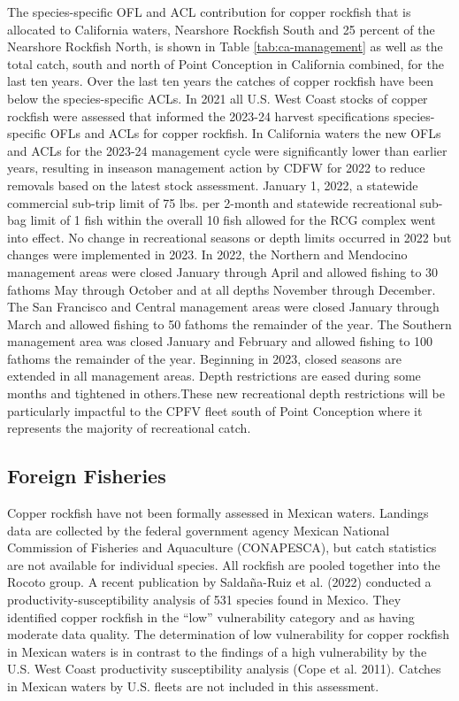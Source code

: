 \documentclass[11pt,
  english,
  letterpaper,
]{article}
\begin{document}
The species-specific OFL and ACL contribution for copper rockfish that is allocated to California waters, Nearshore Rockfish South and 25 percent of the Nearshore Rockfish North, is shown in Table \ref{tab:ca-management} as well as the total catch, south and north of Point Conception in California combined, for the last ten years. Over the last ten years the catches of copper rockfish have been below the species-specific ACLs. In 2021 all U.S. West Coast stocks of copper rockfish were assessed that informed the 2023-24 harvest specifications species-specific OFLs and ACLs for copper rockfish. In California waters the new OFLs and ACLs for the 2023-24 management cycle were significantly lower than earlier years, resulting in inseason management action by CDFW for 2022 to reduce removals based on the latest stock assessment. January 1, 2022, a statewide commercial sub-trip limit of 75 lbs. per 2-month and statewide recreational sub-bag limit of 1 fish within the overall 10 fish allowed for the RCG complex went into effect. No change in recreational seasons or depth limits occurred in 2022 but changes were implemented in 2023. In 2022, the Northern and Mendocino management areas were closed January through April and allowed fishing to 30 fathoms May through October and at all depths November through December. The San Francisco and Central management areas were closed January through March and allowed fishing to 50 fathoms the remainder of the year. The Southern management area was closed January and February and allowed fishing to 100 fathoms the remainder of the year. Beginning in 2023, closed seasons are extended in all management areas. Depth restrictions are eased during some months and tightened in others.These new recreational depth restrictions will be particularly impactful to the CPFV fleet south of Point Conception where it represents the majority of recreational catch.

\hypertarget{foreign-fisheries}{%
\subsection{Foreign Fisheries}\label{foreign-fisheries}}

Copper rockfish have not been formally assessed in Mexican waters. Landings data are collected by the federal government agency Mexican National Commission of Fisheries and Aquaculture (CONAPESCA), but catch statistics are not available for individual species. All rockfish are pooled together into the Rocoto group. A recent publication by Saldaña-Ruiz et al. (2022) conducted a productivity-susceptibility analysis of 531 species found in Mexico. They identified copper rockfish in the ``low'' vulnerability category and as having moderate data quality. The determination of low vulnerability for copper rockfish in Mexican waters is in contrast to the findings of a high vulnerability by the U.S. West Coast productivity susceptibility analysis (Cope et al. 2011). Catches in Mexican waters by U.S. fleets are not included in this assessment.
\end{document}
